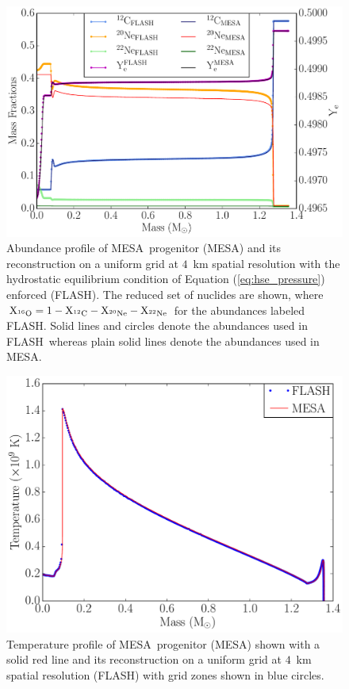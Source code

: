 \documentclass[iop,apj]{emulateapj}
\newcommand{\eqqref}[1]{Equation (\ref{#1})}
\newcommand{\C}[1]{\ensuremath{{}^{#1}{\rm C}}}
\newcommand{\Ox}[1]{\ensuremath{{}^{#1}{\rm O}}}
\newcommand{\Ne}[1]{\ensuremath{{}^{#1}{\rm Ne}}}
\newcommand{\code}[1]{\textsc{#1}}
\newcommand{\FLASH}{\code{FLASH}}
\newcommand{\MESA}{\code{MESA}}
\begin{document}
\begin{figure}[t]
	\includegraphics[width=\linewidth]{figures/progenitor_400k/Dr-400k/cf_wdb_mesa_comp_vs_mass.pdf}
	\caption{\label{fig:progenitor_abundances} Abundance profile
          of \MESA\ progenitor (\MESA) and its reconstruction on a
          uniform grid at $4$~km spatial resolution with the hydrostatic equilibrium condition of
          \eqqref{eq:hse_pressure} enforced (\FLASH). The reduced set
          of nuclides are shown, where $\mathrm{X_{\Ox{16}} = 1 -
            X_{\C{12}} - X_{\Ne{20}} - X_{\Ne{22}}}$ for the
          abundances labeled \FLASH. Solid lines and circles denote
          the abundances used in \FLASH\ whereas plain solid lines
          denote the abundances used in \MESA.}
\end{figure}

\begin{figure}[t]
	\includegraphics[width=0.9\linewidth]{figures/progenitor_400k/Dr-400k/cf_wdb_mesa_temp.pdf}
	\caption{\label{fig:progenitor_temperatures} Temperature
          profile of \MESA\ progenitor (\MESA) shown with a solid red
          line and its reconstruction on a uniform grid at $4$~km spatial resolution (\FLASH) with
          grid zones shown in blue circles.}
\end{figure}
\end{document}
